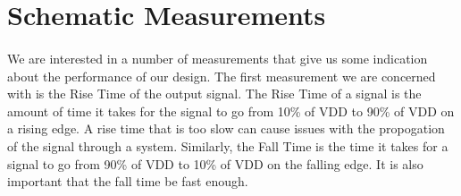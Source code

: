 \documentclass{article}
\begin{document}
\section{Schematic Measurements}
  \paragraph{}
  We are interested in a number of measurements that give us some indication about the performance of our design. The first measurement we are concerned with is the Rise Time of the output signal. The Rise Time of a signal is the amount of time it takes for the signal to go from 10\% of VDD to 90\% of VDD on a rising edge. A rise time that is too slow can cause issues with the propogation of the signal through a system. Similarly, the Fall Time is the time it takes for a signal to go from 90\% of VDD to 10\% of VDD on the falling edge. It is also important that the fall time be fast enough. 

  \paragraph{}

\end{document}

